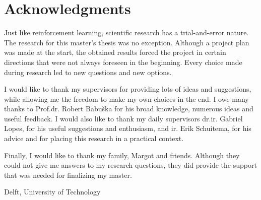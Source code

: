 \chapter{Acknowledgments}

Just like reinforcement learning, scientific research has a trial-and-error nature. The research for this master's thesis was no exception. Although a project plan was made at the start, the obtained results forced the project in certain directions that were not always foreseen in the beginning. Every choice made during research led to new questions and new options. 

I would like to thank my supervisors for providing lots of ideas and suggestions, while allowing me the freedom to make my own choices in the end. I owe many thanks to Prof.dr. Robert Babu\v{s}ka for his broad knowledge, numerous ideas and useful feedback. I would also like to thank my daily supervisors dr.ir. Gabriel Lopes, for his useful suggestions and enthusiasm, and ir. Erik Schuitema, for his advice and for placing this research in a practical context.

Finally, I would like to thank my family, Margot and friends. Although they could not give me answers to my research questions, they did provide the support that was needed for finalizing my master.

Delft, University of Technology \hfill \mscname \\
\mscdate